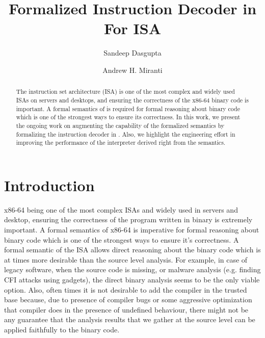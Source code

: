 \documentclass[a4paper,UKenglish,cleveref, autoref]{lipics-v2019}
\title{Formalized Instruction Decoder in \K For \ISA ISA} %
\author{Sandeep Dasgupta}{University of Illinois at Urbana Champaign, USA \and \url{http://sdasgup3.web.engr.illinois.edu} }{sdasgup3@illinois.edu}{}{}
\author{Andrew H. Miranti}{University of Illinois at Urbana Champaign, USA}{miranti2@illinois.edu}{}{}
\begin{document}
\maketitle

\begin{abstract}
    The \ISA instruction set architecture (ISA) is one of the
    most complex and widely used ISAs on servers and desktops,
    and ensuring the correctness of the x86-64 binary code is
    important. A formal semantics of \ISA is required for formal reasoning
    about binary code which is one of the strongest ways to ensure
    its correctness. 
    In this work, we present the ongoing work on augmenting the capability of the formalized semantics by formalizing the instruction decoder in \K. Also, we highlight  the engineering effort in improving the performance of the interpreter derived right from the semantics. 
\end{abstract}

\section{Introduction}
\label{sec:intro}
x86-64 being one of the most complex ISAs and widely used in servers and desktop, ensuring the correctness of the program written in binary is extremely important. A formal semantics of x86-64 is imperative for formal reasoning about binary code which is  one of the strongest ways to ensure it's correctness. A formal semantic of the ISA allows direct reasoning about the binary code which is at times more desirable than the source level analysis. For example, in case of legacy software, when the source code is missing, or malware analysis (e.g. finding CFI attacks using gadgets), the direct binary analysis seems to be the only viable option.  Also, often times it is not desirable to add the compiler in the trusted base because, due to presence of compiler bugs or some aggressive optimization that compiler does in the presence of undefined behaviour, there might not be any guarantee that the analysis results that we gather at the source level  can be applied faithfully to the binary code.  
\end{document}
